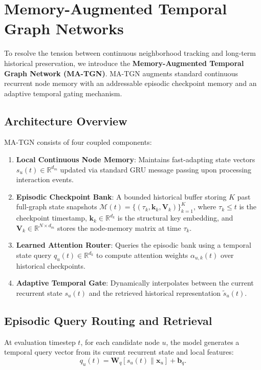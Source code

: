 \section{Memory-Augmented Temporal Graph Networks}
\label{sec:methods}

To resolve the tension between continuous neighborhood tracking and long-term historical preservation, we introduce the \textbf{Memory-Augmented Temporal Graph Network (MA-TGN)}. MA-TGN augments standard continuous recurrent node memory with an addressable episodic checkpoint memory and an adaptive temporal gating mechanism.

\subsection{Architecture Overview}
MA-TGN consists of four coupled components:
\begin{enumerate}
    \item \textbf{Local Continuous Node Memory}: Maintains fast-adapting state vectors $s_u(t) \in \mathbb{R}^{d_m}$ updated via standard GRU message passing upon processing interaction events.
    \item \textbf{Episodic Checkpoint Bank}: A bounded historical buffer storing $K$ past full-graph state snapshots $\mathcal{M}(t) = \{(\tau_k, \mathbf{k}_k, \mathbf{V}_k)\}_{k=1}^K$, where $\tau_k \le t$ is the checkpoint timestamp, $\mathbf{k}_k \in \mathbb{R}^{d_k}$ is the structural key embedding, and $\mathbf{V}_k \in \mathbb{R}^{N \times d_m}$ stores the node-memory matrix at time $\tau_k$.
    \item \textbf{Learned Attention Router}: Queries the episodic bank using a temporal state query $q_u(t) \in \mathbb{R}^{d_k}$ to compute attention weights $\alpha_{u,k}(t)$ over historical checkpoints.
    \item \textbf{Adaptive Temporal Gate}: Dynamically interpolates between the current recurrent state $s_u(t)$ and the retrieved historical representation $\tilde{s}_u(t)$.
\end{enumerate}

\subsection{Episodic Query Routing and Retrieval}
At evaluation timestep $t$, for each candidate node $u$, the model generates a temporal query vector from its current recurrent state and local features:
\begin{equation}
    q_u(t) = \mathbf{W}_q [s_u(t) \parallel \mathbf{x}_u] + \mathbf{b}_q.
\end{equation}

